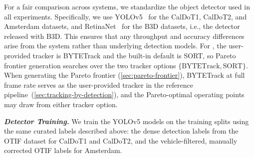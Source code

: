 For a fair comparison across systems,
we standardize the object detector used in all experiments.
Specifically,
we use YOLOv5~\cite{khanam2024yolov5} for the CalDoT1, CalDoT2, and Amsterdam datasets,
and RetinaNet~\cite{lin2017focal} for the B3D datasets,
i.e., the detector released with B3D.
This ensures that any throughput and accuracy differences arise from the system rather than underlying detection models.
For \sys{},
the user-provided tracker is BYTETrack and the built-in default is SORT,
so Pareto frontier generation searches over the two tracker options $\{\text{BYTETrack}, \text{SORT}\}$.
When generating the Pareto frontier (\autoref{sec:pareto-frontier}),
BYTETrack at full frame rate serves as the user-provided tracker in the
reference pipeline~(\autoref{sec:tracking-by-detection}), and 
the Pareto-optimal operating points may draw from either tracker option.

\textbf{\em Detector Training.}
We train the YOLOv5 models on the training splits using the same curated labels described above:
the dense detection labels from the OTIF dataset for CalDoT1 and CalDoT2,
and the vehicle-filtered,
manually corrected OTIF labels for Amsterdam.

